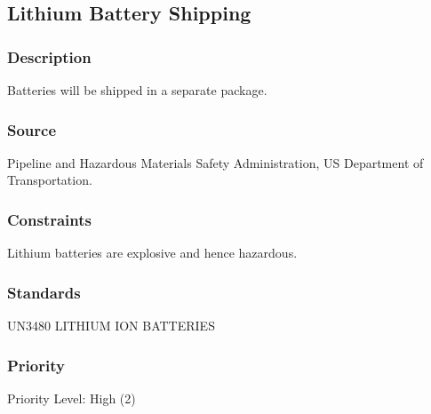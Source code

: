\subsection{Lithium Battery Shipping}
\subsubsection{Description}
Batteries will be shipped in a separate package.
\subsubsection{Source}
Pipeline and Hazardous Materials Safety Administration, US Department of Transportation.
\subsubsection{Constraints}
Lithium batteries are explosive and hence hazardous.
\subsubsection{Standards}
UN3480 LITHIUM ION BATTERIES \cite{PHMSA}
\subsubsection{Priority}
Priority Level: High (2)